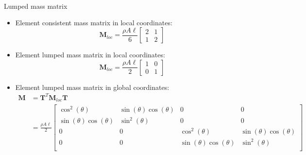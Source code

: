 \documentclass[aspectratio=169]{beamer}
\begin{document}
{\begin{frame}{Lumped mass matrix}
  \begin{itemize}
    \item Element consistent mass matrix in local coordinates:
          \[ \mathbf{M}_{loc} =\frac{\rho A\ell }{6} \begin{bmatrix} 2 & 1 \\ 1 & 2 \end{bmatrix} \]
    \item Element lumped mass matrix in local coordinates:
          \[ \mathbf{M}_{loc} =\frac{\rho A\ell }{2} \begin{bmatrix} 1 & 0 \\ 0 & 1 \end{bmatrix} \]
    \item Element lumped mass matrix in global coordinates:
          \begin{align*}
            \mathbf{M} & = \mathbf T^T \mathbf{M}_{loc} \mathbf T                                                                                       \\
                       & =\frac{\rho A\ell}{2}\begin{bmatrix}
                                                \cos^2(\theta)           & \sin(\theta)\cos(\theta) & 0                        & 0                        \\
                                                \sin(\theta)\cos(\theta) & \sin^2(\theta)           & 0                        & 0                        \\
                                                0                        & 0                        & \cos^2(\theta)           & \sin(\theta)\cos(\theta) \\
                                                0                        & 0                        & \sin(\theta)\cos(\theta) & \sin^2(\theta)           \\
                                              \end{bmatrix}
          \end{align*}
  \end{itemize}
\end{frame}
}
\end{document}
